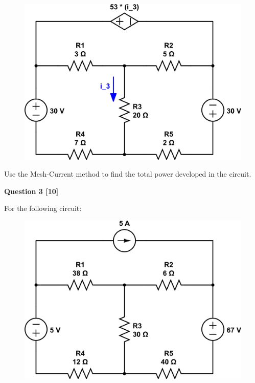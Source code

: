 \documentclass[12pt]{article}
\begin{document}
\begin{figure}[h!]
\begin{center}
 \includegraphics[scale=0.4]{fig4_40.png}
\end{center}
\end{figure}

Use the Mesh-Current method to find the total power developed in the circuit.

\newpage

{\bf Question 3 [10]} %

For the following circuit:

\begin{figure}[h!]
\begin{center}
 \includegraphics[scale=0.4]{fig4_45.png}
\end{center}
\end{figure}
\end{document}
